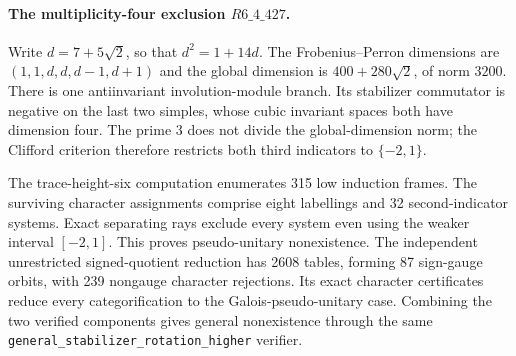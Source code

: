 \paragraph{The multiplicity-four exclusion $R6\_4\_427$.}
Write $d=7+5\sqrt2$, so that $d^2=1+14d$. The Frobenius--Perron
dimensions are $(1,1,d,d,d-1,d+1)$ and the global dimension is
$400+280\sqrt2$, of norm $3200$. There is one antiinvariant
involution-module branch. Its stabilizer commutator is negative on the
last two simples, whose cubic invariant spaces both have dimension four.
The prime $3$ does not divide the global-dimension norm; the Clifford
criterion therefore restricts both third indicators to $\{-2,1\}$.

The trace-height-six computation enumerates 315 low induction frames.
The surviving character assignments comprise eight labellings and 32
second-indicator systems. Exact separating rays exclude every system
even using the weaker interval $[-2,1]$. This proves pseudo-unitary
nonexistence. The independent unrestricted signed-quotient reduction
has 2608 tables, forming 87 sign-gauge orbits, with 239 nongauge
character rejections. Its exact character certificates reduce every
categorification to the Galois-pseudo-unitary case. Combining the two
verified components gives general nonexistence through the same
\texttt{general\_stabilizer\_rotation\_higher} verifier.

